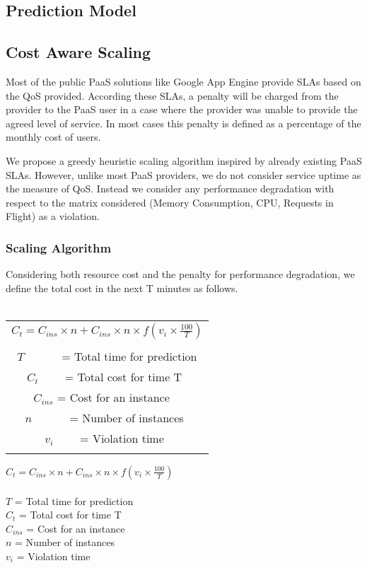 \subsection{Prediction Model}

\subsection{Cost Aware Scaling}
Most of the public PaaS solutions like Google App Engine provide SLAs based on the QoS provided. According these SLAs, a penalty will be charged from the provider to the PaaS user in a case where the provider was unable to provide the agreed level of service. In most cases this penalty is defined as a percentage of the monthly cost of users.

We propose a greedy heuristic scaling algorithm inspired by already existing PaaS SLAs. However, unlike most PaaS providers, we do not consider service uptime as the measure of QoS. Instead we consider any performance degradation with respect to the matrix considered (Memory Consumption, CPU, Requests in Flight) as a violation.

\subsubsection{Scaling Algorithm}
Considering both resource cost and the penalty for performance degradation, we define the total cost in the next T minutes as follows.\\
\\
\begin{table} 
    \begin{tabular}{ c }
        \textbf{$ C_t = C_{ins} \times n  +  C_{ins} \times n \times f(v_i \times \frac{100}{T}) $} \\\\$ T $       = Total time for prediction \\$ C_t $     = Total cost for time T  \\$ C_{ins} $ = Cost for an instance   \\$ n $       = Number of instances  \\$ v_i $     = Violation time  \\ \\ 
    \end{tabular} 
\end{table}
\textbf{$ C_t = C_{ins} \times n  +  C_{ins} \times n \times f(v_i \times \frac{100}{T}) $} \\
\\
$ T $       = Total time for prediction \\
$ C_t $     = Total cost for time T  \\
$ C_{ins} $ = Cost for an instance   \\
$ n $       = Number of instances  \\
$ v_i $     = Violation time  \\


